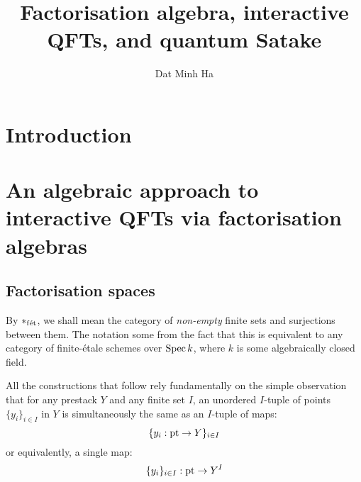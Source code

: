 

\setcounter{section}{-1}





    \title{Factorisation algebra, interactive QFTs, and quantum Satake}
    
    \author{Dat Minh Ha}
    \maketitle
    
    \begin{abstract}
        
    \end{abstract}
    
    {
      \hypersetup{} 
      \tableofcontents %
    }

    \section{Introduction}

    \section{An algebraic approach to interactive QFTs via factorisation algebras}
        \subsection{Factorisation spaces}
            \begin{convention}
                By $*_{\mathrm{f\acute{e}t}}$, we shall mean the category of \textit{non-empty} finite sets and surjections between them. The notation some from the fact that this is equivalent to any category of finite-\'etale schemes over $\operatorname{Spec} k$, where $k$ is some algebraically closed field.  
            \end{convention}

            \begin{remark}
                All the constructions that follow rely fundamentally on the simple observation that for any prestack $Y$ and any finite set $I$, an unordered $I$-tuple of points $\{y_i\}_{i \in I}$ in $Y$ is simultaneously the same as an $I$-tuple of maps:
                    $$\{y_i: \mathrm{pt} \to Y\}_{i \in I}$$
                or equivalently, a single map:
                    $$\{y_i\}_{i \in I}: \mathrm{pt} \to Y^I$$
            \end{remark}

